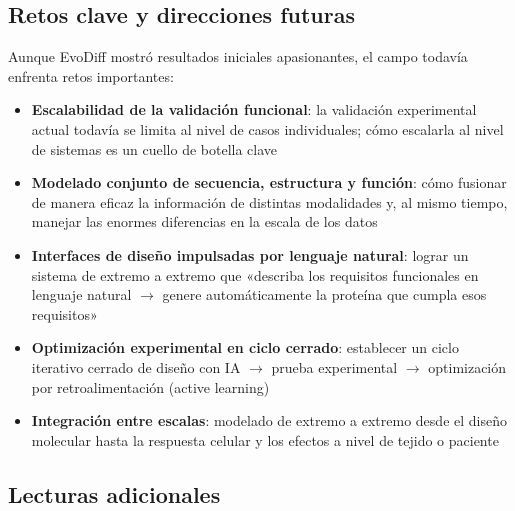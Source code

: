\documentclass[a4paper]{article}
\begin{document}
\subsection{Retos clave y direcciones futuras}

Aunque EvoDiff mostró resultados iniciales apasionantes, el campo todavía enfrenta retos importantes:

\begin{itemize}
    \item \textbf{Escalabilidad de la validación funcional}: la validación experimental actual todavía se limita al nivel de casos individuales; cómo escalarla al nivel de sistemas es un cuello de botella clave
    \item \textbf{Modelado conjunto de secuencia, estructura y función}: cómo fusionar de manera eficaz la información de distintas modalidades y, al mismo tiempo, manejar las enormes diferencias en la escala de los datos
    \item \textbf{Interfaces de diseño impulsadas por lenguaje natural}: lograr un sistema de extremo a extremo que «describa los requisitos funcionales en lenguaje natural $\rightarrow$ genere automáticamente la proteína que cumpla esos requisitos»
    \item \textbf{Optimización experimental en ciclo cerrado}: establecer un ciclo iterativo cerrado de diseño con IA $\rightarrow$ prueba experimental $\rightarrow$ optimización por retroalimentación (active learning)
    \item \textbf{Integración entre escalas}: modelado de extremo a extremo desde el diseño molecular hasta la respuesta celular y los efectos a nivel de tejido o paciente
\end{itemize}

\subsection{Lecturas adicionales}
\end{document}
